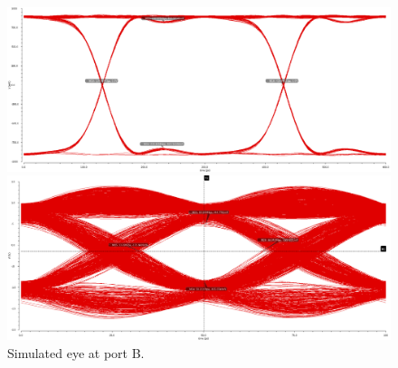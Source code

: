 \documentclass{book}  %
\begin{document}
\begin{paper}
\begin{figure}[htbp!]
	\begin{minipage}[tb]{0.5\textwidth}
		\centering	
		\includegraphics[width=\textwidth]{./img/channel_response_eye_diagram/3gbp_eye_total_before_dfe.png}
	\end{minipage}%
	\begin{minipage}[tb]{0.5\textwidth}
		\centering	
		\includegraphics[width=\textwidth]{./img/channel_response_eye_diagram/20gbp_eye_total_before_dfe.png}
	\end{minipage}%
	\label{fig:eye_total_port_B}
	\caption{Simulated eye at port B.}
\end{figure}


\end{paper}
\end{document}
